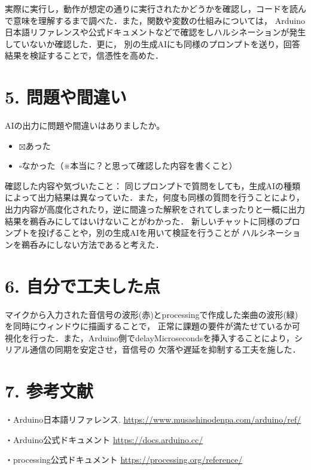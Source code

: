 \documentclass[a4paper,11pt,dvipdfmx]{jsarticle}
\newcommand{\cboxon}{$\boxtimes$}
\newcommand{\cboxoff}{$\square$}
\begin{document}
実際に実行し，動作が想定の通りに実行されたかどうかを確認し，コードを読んで意味を理解するまで調べた．また，関数や変数の仕組みについては，
Arduino日本語リファレンスや公式ドキュメントなどで確認をしハルシネーションが発生していないか確認した．更に，
別の生成AIにも同様のプロンプトを送り，回答結果を検証することで，信憑性を高めた．


\section*{5. 問題や間違い}
AIの出力に問題や間違いはありましたか。
\begin{itemize}
  \item \cboxon あった
  \item \cboxoff なかった（※本当に？と思って確認した内容を書くこと）
\end{itemize}
確認した内容や気づいたこと：
同じプロンプトで質問をしても，生成AIの種類によって出力結果は異なっていた．また，何度も同様の質問を行うことにより，
出力内容が高度化されたり，逆に間違った解釈をされてしまったりと一概に出力結果を鵜呑みにしてはいけないことがわかった．
新しいチャットに同様のプロンプトを投げることや，別の生成AIを用いて検証を行うことが
ハルシネーションを鵜呑みにしない方法であると考えた．

\section*{6. 自分で工夫した点}
マイクから入力された音信号の波形(赤)とprocessingで作成した楽曲の波形(緑)を同時にウィンドウに描画することで，
正常に課題の要件が満たせているか可視化を行った．また，Arduino側でdelayMicrosecondsを挿入することにより，シリアル通信の同期を安定させ，音信号の
欠落や遅延を抑制する工夫を施した．

\section*{7. 参考文献}

  ・Arduino日本語リファレンス.  
  \url{https://www.musashinodenpa.com/arduino/ref/}

  ・Arduino公式ドキュメント
  \url{https://docs.arduino.cc/}\par

  ・processing公式ドキュメント
  \url{https://processing.org/reference/}


 
\end{document}
